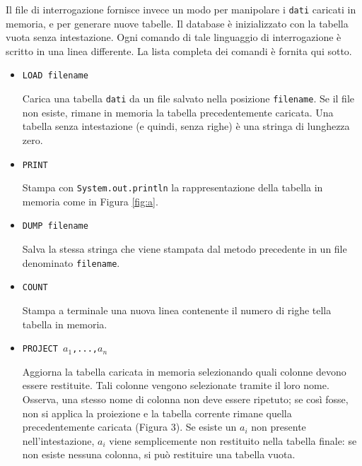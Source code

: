 \documentclass[]{scrartcl}
\begin{document}
Il file di interrogazione fornisce invece un modo per manipolare i \texttt{dati} caricati in memoria, e per generare nuove tabelle. Il database è inizializzato con la tabella vuota senza intestazione. Ogni comando di tale linguaggio di interrogazione è scritto in una linea differente. La lista completa dei comandi è fornita qui sotto.
\begin{itemize}
	\item \texttt{LOAD filename}
	
	Carica una tabella \texttt{dati} da un file salvato nella posizione \texttt{filename}. Se il file non esiste, rimane in memoria la tabella precedentemente caricata. Una tabella senza intestazione (e quindi, senza righe) è una stringa di lunghezza zero.
	\item \texttt{PRINT}
	
	Stampa con \texttt{System.out.println} la rappresentazione della tabella in memoria come in Figura \ref{fig:a}. 
	\item \texttt{DUMP filename}
	
	Salva la stessa stringa che viene stampata dal metodo precedente in un file denominato \texttt{filename}.
	
	\item \texttt{COUNT}
	
	Stampa a terminale una nuova linea contenente il numero di righe tella tabella in memoria.
	
	\item \texttt{PROJECT $a_1$,...,$a_n$}
	
	Aggiorna la tabella caricata in memoria selezionando quali colonne devono essere restituite. Tali colonne vengono selezionate tramite il loro nome. Osserva, una stesso nome di colonna non deve essere ripetuto; se così fosse, non si applica la proiezione e la tabella corrente rimane quella precedentemente caricata (Figura 3). Se esiste un $a_i$ non presente nell'intestazione, $a_i$ viene semplicemente non restituito nella tabella finale: se non esiste nessuna colonna, si può restituire una tabella vuota.
	

\end{itemize}
\end{document}
